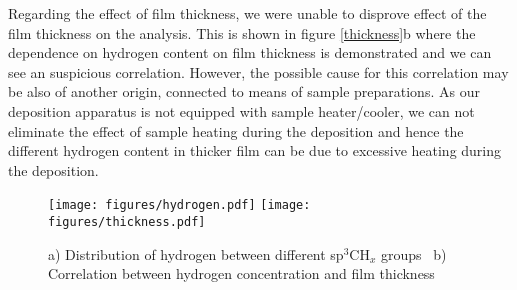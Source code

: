\documentclass[10pt]{article}
\begin{document}
Regarding the effect of film thickness, we were unable to disprove effect of the film thickness on the analysis.
This is shown in figure \ref{thickness}b where the dependence on hydrogen content on film thickness is demonstrated and we can see an suspicious correlation.
However, the possible cause for this correlation may be also of another origin, connected to means of sample preparations.
As our deposition apparatus is not equipped with sample heater/cooler, we can not eliminate the effect of sample heating during the deposition and hence the different hydrogen content in thicker film can be due to excessive heating during the deposition.

\begin{figure}[h!]
\begin{centering}
\texttt{[image: figures/hydrogen.pdf]}
\texttt{[image: figures/thickness.pdf]}
\caption{ a) Distribution of hydrogen between different sp$^3$CH$_x$ groups~\cite{Ondracka2013} b) Correlation between hydrogen concentration and film thickness}
\label{thickness}
\label{hydrogen}
\end{centering}
\end{figure}

\vspace{-0.6cm}



\end{document}
